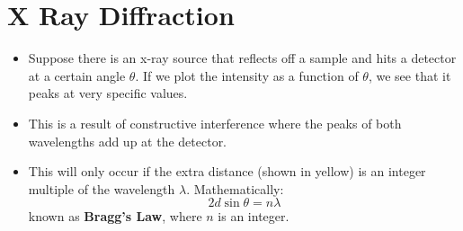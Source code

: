 \section{X Ray Diffraction}
\begin{itemize}
    \item Suppose there is an x-ray source that reflects off a sample and hits a detector at a certain angle $\theta$. If we plot the intensity as a function of $\theta$, we see that it peaks at very specific values.
    \begin{center}
    \end{center}
    \item This is a result of constructive interference where the peaks of both wavelengths add up at the detector.
    \item This will only occur if the extra distance (shown in yellow) is an integer multiple of the wavelength $\lambda$. Mathematically:
    \begin{equation}
        2d\sin\theta = n\lambda
    \end{equation}
    known as \textbf{Bragg's Law}, where $n$ is an integer.
\end{itemize}